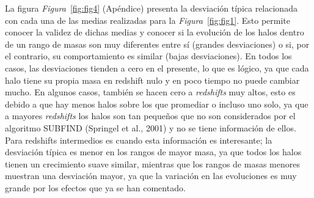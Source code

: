 La figura \textit{Figura}~\ref{fig:fig4} (Apéndice) presenta la desviación típica relacionada con cada una de las medias realizadas para la \textit{Figura}~\ref{fig:fig1}. Esto permite conocer la validez de dichas medias y conocer si la evolución de los halos dentro de un rango de masas son muy diferentes entre sí (grandes desviaciones) o si, por el contrario, su comportamiento es similar (bajas desviaciones). En todos los casos, las desviaciones tienden a cero en el presente, lo que es lógico, ya que cada halo tiene su propia masa en redshift nulo y en poco tiempo no puede cambiar mucho. En algunos casos, también se hacen cero a \textit{redshifts} muy altos, esto es debido a que hay menos halos sobre los que promediar o incluso uno solo, ya que a mayores \textit{redshifts} los halos son tan pequeños que no son considerados por el algoritmo SUBFIND (Springel et al., 2001) \cite{8} y no se tiene información de ellos. Para redshifts intermedios es cuando esta información es interesante; la desviación típica es menor en los rangos de mayor masa, ya que todos los halos tienen un crecimiento suave similar, mientras que los rangos de masas menores muestran una desviación mayor, ya que la variación en las evoluciones es muy grande por los efectos que ya se han comentado. \\

